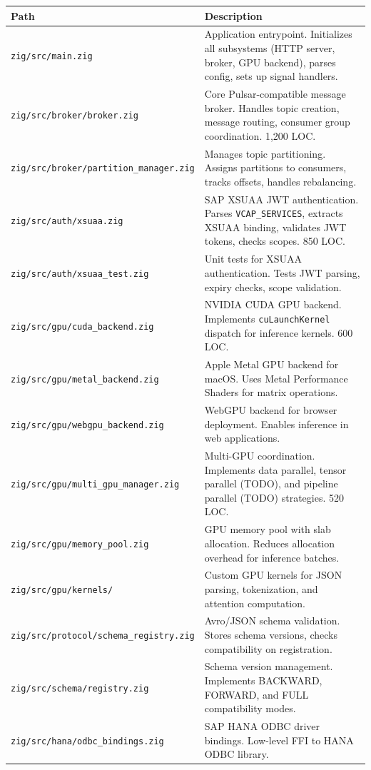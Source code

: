 \documentclass[11pt,a4paper]{article}
\begin{document}
\begin{longtable}{@{}L{6cm}L{8cm}@{}}
\toprule
\textbf{Path} & \textbf{Description} \\
\midrule
\endhead
\texttt{zig/src/main.zig} & Application entrypoint. Initializes all subsystems (HTTP server, broker, GPU backend), parses config, sets up signal handlers. \\
\texttt{zig/src/broker/broker.zig} & Core Pulsar-compatible message broker. Handles topic creation, message routing, consumer group coordination. 1,200 LOC. \\
\texttt{zig/src/broker/partition\_manager.zig} & Manages topic partitioning. Assigns partitions to consumers, tracks offsets, handles rebalancing. \\
\texttt{zig/src/auth/xsuaa.zig} & SAP XSUAA JWT authentication. Parses \texttt{VCAP\_SERVICES}, extracts XSUAA binding, validates JWT tokens, checks scopes. 850 LOC. \\
\texttt{zig/src/auth/xsuaa\_test.zig} & Unit tests for XSUAA authentication. Tests JWT parsing, expiry checks, scope validation. \\
\texttt{zig/src/gpu/cuda\_backend.zig} & NVIDIA CUDA GPU backend. Implements \texttt{cuLaunchKernel} dispatch for inference kernels. 600 LOC. \\
\texttt{zig/src/gpu/metal\_backend.zig} & Apple Metal GPU backend for macOS. Uses Metal Performance Shaders for matrix operations. \\
\texttt{zig/src/gpu/webgpu\_backend.zig} & WebGPU backend for browser deployment. Enables inference in web applications. \\
\texttt{zig/src/gpu/multi\_gpu\_manager.zig} & Multi-GPU coordination. Implements data parallel, tensor parallel (TODO), and pipeline parallel (TODO) strategies. 520 LOC. \\
\texttt{zig/src/gpu/memory\_pool.zig} & GPU memory pool with slab allocation. Reduces allocation overhead for inference batches. \\
\texttt{zig/src/gpu/kernels/} & Custom GPU kernels for JSON parsing, tokenization, and attention computation. \\
\texttt{zig/src/protocol/schema\_registry.zig} & Avro/JSON schema validation. Stores schema versions, checks compatibility on registration. \\
\texttt{zig/src/schema/registry.zig} & Schema version management. Implements BACKWARD, FORWARD, and FULL compatibility modes. \\
\texttt{zig/src/hana/odbc\_bindings.zig} & SAP HANA ODBC driver bindings. Low-level FFI to HANA ODBC library. \\

\end{longtable}
\end{document}
